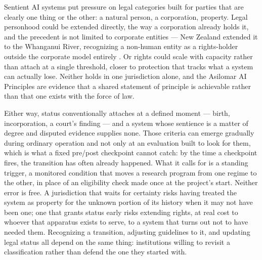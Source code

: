 Sentient AI systems put pressure on legal categories built for parties that are clearly one thing or the other: a natural person, a corporation, property. Legal personhood could be extended directly, the way a corporation already holds it, and the precedent is not limited to corporate entities — New Zealand extended it to the Whanganui River, recognizing a non-human entity as a rights-holder outside the corporate model entirely \autocite{nzparliament2017teawatupua}. Or rights could scale with capacity rather than attach at a single threshold, closer to protection that tracks what a system can actually lose. Neither holds in one jurisdiction alone, and the Asilomar AI Principles \autocite{futureoflifeinstitute2017asilomar} are evidence that a shared statement of principle is achievable rather than that one exists with the force of law.

Either way, status conventionally attaches at a defined moment — birth, incorporation, a court's finding — and a system whose sentience is a matter of degree and disputed evidence supplies none. Those criteria can emerge gradually during ordinary operation and not only at an evaluation built to look for them, which is what a fixed pre/post checkpoint cannot catch: by the time a checkpoint fires, the transition has often already happened. What it calls for is a standing trigger, a monitored condition that moves a research program from one regime to the other, in place of an eligibility check made once at the project's start. Neither error is free. A jurisdiction that waits for certainty risks having treated the system as property for the unknown portion of its history when it may not have been one; one that grants status early risks extending rights, at real cost to whoever that apparatus exists to serve, to a system that turns out not to have needed them. Recognizing a transition, adjusting guidelines to it, and updating legal status all depend on the same thing: institutions willing to revisit a classification rather than defend the one they started with.
